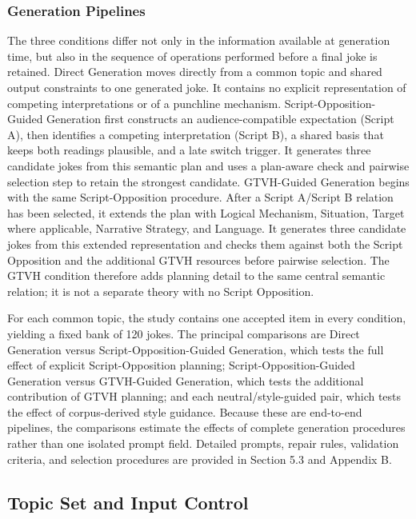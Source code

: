 \documentclass[11pt]{article}
\begin{document}
\subsubsection{Generation Pipelines}\label{generation-pipelines}

The three conditions differ not only in the information available at generation time, but also in the sequence of operations performed before a final joke is retained. Direct Generation moves directly from a common topic and shared output constraints to one generated joke. It contains no explicit representation of competing interpretations or of a punchline mechanism. Script-Opposition-Guided Generation first constructs an audience-compatible expectation (Script A), then identifies a competing interpretation (Script B), a shared basis that keeps both readings plausible, and a late switch trigger. It generates three candidate jokes from this semantic plan and uses a plan-aware check and pairwise selection step to retain the strongest candidate. GTVH-Guided Generation begins with the same Script-Opposition procedure. After a Script A/Script B relation has been selected, it extends the plan with Logical Mechanism, Situation, Target where applicable, Narrative Strategy, and Language. It generates three candidate jokes from this extended representation and checks them against both the Script Opposition and the additional GTVH resources before pairwise selection. The GTVH condition therefore adds planning detail to the same central semantic relation; it is not a separate theory with no Script Opposition.

 For each common topic, the study contains one accepted item in every condition, yielding a fixed bank of 120 jokes. The principal comparisons are Direct Generation versus Script-Opposition-Guided Generation, which tests the full effect of explicit Script-Opposition planning; Script-Opposition-Guided Generation versus GTVH-Guided Generation, which tests the additional contribution of GTVH planning; and each neutral/style-guided pair, which tests the effect of corpus-derived style guidance. Because these are end-to-end pipelines, the comparisons estimate the effects of complete generation procedures rather than one isolated prompt field. Detailed prompts, repair rules, validation criteria, and selection procedures are provided in Section 5.3 and Appendix B.

\subsection{Topic Set and Input Control}\label{topic-set-and-input-control}
\end{document}
